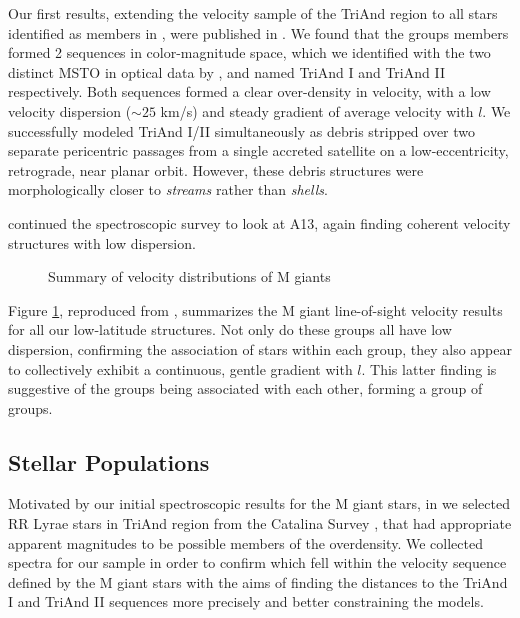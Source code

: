 \documentclass[galaxies,article,submit,moreauthors,pdftex,10pt,a4paper]{mdpi}
\begin{document}
Our first results, extending the \cite{rochapinto04} velocity sample of the TriAnd region to all stars identified as members in \cite{sharma10}, were published in  \cite{sheffield14}.
We found that the groups members formed 2 sequences in color-magnitude space, which we identified with the two distinct MSTO in optical data by \cite{martin07}, and named TriAnd I and TriAnd II respectively.
Both sequences formed a clear over-density in velocity, with a low velocity dispersion ($\sim 25$ km/s)  and steady gradient of average velocity with $l$.
We successfully modeled TriAnd I/II simultaneously as debris stripped over two separate pericentric passages from a single accreted satellite on a low-eccentricity, retrograde, near planar orbit.
However, these debris structures were morphologically closer to {\it streams} rather than {\it shells}.

\cite{li17} continued the spectroscopic survey to look at A13, again finding coherent velocity structures with low dispersion.

\begin{figure}[t]
\centering
\caption{\label{fig:ting_vel}
Summary of velocity distributions of M giants}
\end{figure}


Figure \ref{fig:ting_vel}, reproduced from \cite{li17}, summarizes the M giant line-of-sight velocity results for all our low-latitude structures.
Not only do these groups all have low dispersion, confirming the association of stars within each group, they also appear to collectively exhibit a continuous, gentle gradient with $l$.
This latter finding is suggestive of the groups being associated with each other, forming a group of groups.


\subsection{Stellar Populations}

Motivated by our initial spectroscopic results for the M giant stars, in \cite{pricewhelan15} we selected RR Lyrae stars in TriAnd region from the Catalina Survey \citep{drake14}, that had appropriate apparent magnitudes to be possible members of the overdensity.
We collected spectra for our sample in order to confirm which fell within the velocity sequence defined by the M giant stars with the aims of finding the distances to the TriAnd I and TriAnd II sequences more precisely and better constraining the models.
\end{document}
